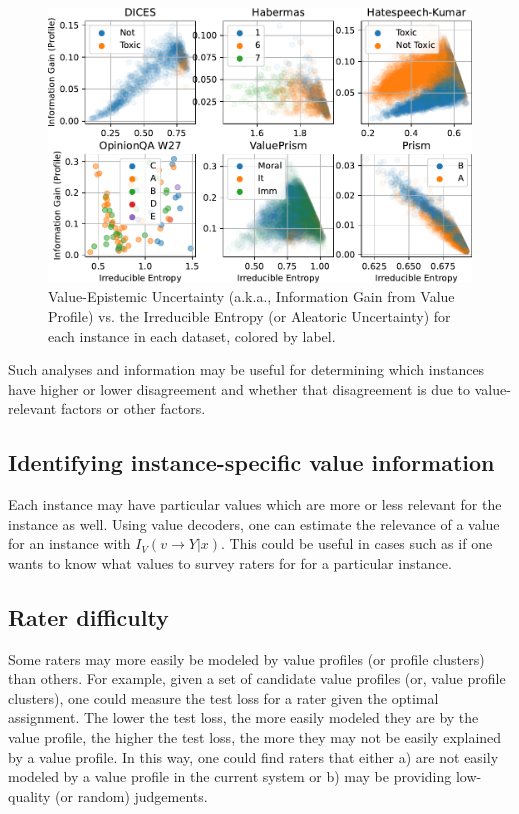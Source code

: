 \documentclass[11pt]{article}
\begin{document}
\begin{figure}[ht]
\centering
\includegraphics[width=\textwidth]{files/instance_uncertainty.pdf}
\caption{Value-Epistemic Uncertainty (a.k.a., Information Gain from Value Profile) vs. the Irreducible Entropy (or Aleatoric Uncertainty) for each instance in each dataset, colored by label.}
\label{fig:instance uncertainty}
\end{figure}

Such analyses and information may be useful for determining which instances have higher or lower disagreement and whether that disagreement is due to value-relevant factors or other factors.

\subsection{Identifying instance-specific value information}

Each instance may have particular values which are more or less relevant for the instance as well. Using value decoders, one can estimate the relevance of a value for an instance with $I_V(v \to Y|x)$. This could be useful in cases such as if one wants to know what values to survey raters for for a particular instance.

\subsection{Rater difficulty}

Some raters may more easily be modeled by value profiles (or profile clusters) than others.
For example, given a set of candidate value profiles (or, value profile clusters), one could measure the test loss for a rater given the optimal assignment. The lower the test loss, the more easily modeled they are by the value profile, the higher the test loss, the more they may not be easily explained by a value profile.
In this way, one could find raters that either a) are not easily modeled by a value profile in the current system or b) may be providing low-quality (or random) judgements.
\end{document}
